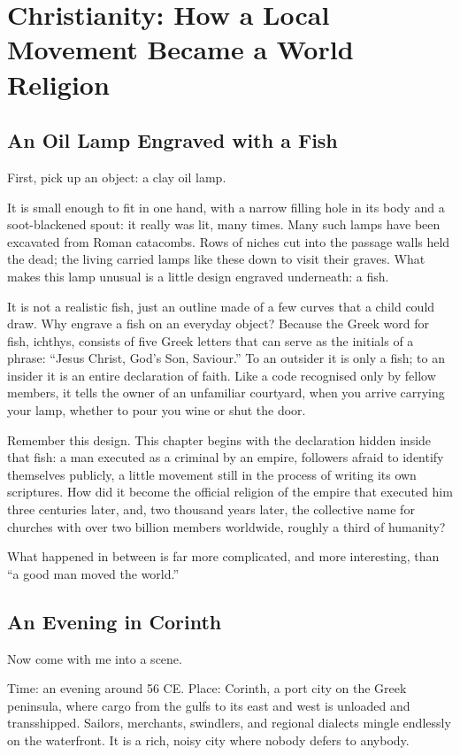 \chapter[Christianity: A World Religion]{Christianity: How a Local Movement Became a World Religion}
\section{An Oil Lamp Engraved with a Fish}
First, pick up an object: a clay oil lamp.

It is small enough to fit in one hand, with a narrow filling hole in its body and a soot-blackened spout: it really was lit, many times. Many such lamps have been excavated from Roman catacombs. Rows of niches cut into the passage walls held the dead; the living carried lamps like these down to visit their graves. What makes this lamp unusual is a little design engraved underneath: a fish.

It is not a realistic fish, just an outline made of a few curves that a child could draw. Why engrave a fish on an everyday object? Because the Greek word for fish, ichthys, consists of five Greek letters that can serve as the initials of a phrase: ``Jesus Christ, God's Son, Saviour.'' To an outsider it is only a fish; to an insider it is an entire declaration of faith. Like a code recognised only by fellow members, it tells the owner of an unfamiliar courtyard, when you arrive carrying your lamp, whether to pour you wine or shut the door.

Remember this design. This chapter begins with the declaration hidden inside that fish: a man executed as a criminal by an empire, followers afraid to identify themselves publicly, a little movement still in the process of writing its own scriptures. How did it become the official religion of the empire that executed him three centuries later, and, two thousand years later, the collective name for churches with over two billion members worldwide, roughly a third of humanity?

What happened in between is far more complicated, and more interesting, than ``a good man moved the world.''

\section{An Evening in Corinth}
Now come with me into a scene.

Time: an evening around 56 CE. Place: Corinth, a port city on the Greek peninsula, where cargo from the gulfs to its east and west is unloaded and transshipped. Sailors, merchants, swindlers, and regional dialects mingle endlessly on the waterfront. It is a rich, noisy city where nobody defers to anybody.

